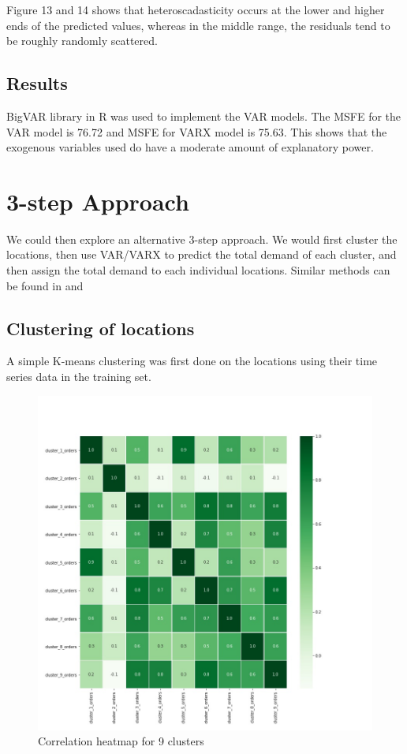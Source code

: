 \documentclass[12pt, letterpaper] {article}
\begin{document}
Figure 13 and 14 shows that heteroscadasticity occurs at the lower and higher ends of the predicted values, whereas in the middle range, the residuals tend to be roughly randomly scattered.

\subsection{Results}
BigVAR library in R was used to implement the VAR models. The MSFE for the VAR model is 76.72 and MSFE for VARX model is 75.63. This shows that the exogenous variables used do have a moderate amount of explanatory power. 

\section{3-step Approach}

We could then explore an alternative 3-step approach. We would first cluster the locations, then use VAR/VARX to predict the total demand of each cluster, and then assign the total demand to each individual locations. Similar methods can be found in \cite{Paul2015} and \cite{Chi2014}

\subsection{Clustering of locations}

A simple K-means clustering was first done on the locations using their time series data in the training set.

\begin{figure}[H]
    \centering
    \includegraphics[width=\textwidth, height=0.8\textheight]{Images/cluster_corr_heatmap.jpg}
    \caption{Correlation heatmap for 9 clusters}
    \label{fig:Correlation heatmap for 9 clusters}
\end{figure}
\end{document}
